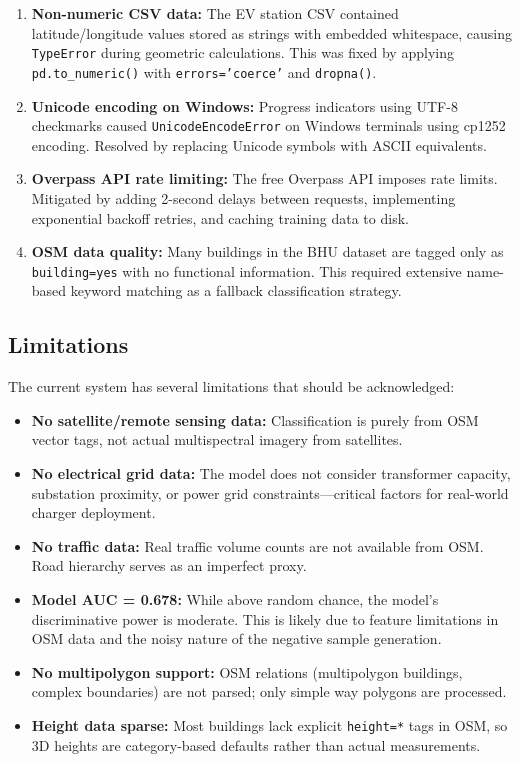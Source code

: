 \documentclass[conference]{IEEEtran}
\begin{document}
\begin{enumerate}
\item \textbf{Non-numeric CSV data:} The EV station CSV contained latitude/longitude values stored as strings with embedded whitespace, causing \texttt{TypeError} during geometric calculations. This was fixed by applying \texttt{pd.to\_numeric()} with \texttt{errors='coerce'} and \texttt{dropna()}.

\item \textbf{Unicode encoding on Windows:} Progress indicators using UTF-8 checkmarks caused \texttt{UnicodeEncodeError} on Windows terminals using cp1252 encoding. Resolved by replacing Unicode symbols with ASCII equivalents.

\item \textbf{Overpass API rate limiting:} The free Overpass API imposes rate limits. Mitigated by adding 2-second delays between requests, implementing exponential backoff retries, and caching training data to disk.

\item \textbf{OSM data quality:} Many buildings in the BHU dataset are tagged only as \texttt{building=yes} with no functional information. This required extensive name-based keyword matching as a fallback classification strategy.
\end{enumerate}

\subsection{Limitations}

The current system has several limitations that should be acknowledged:

\begin{itemize}
\item \textbf{No satellite/remote sensing data:} Classification is purely from OSM vector tags, not actual multispectral imagery from satellites.

\item \textbf{No electrical grid data:} The model does not consider transformer capacity, substation proximity, or power grid constraints---critical factors for real-world charger deployment.

\item \textbf{No traffic data:} Real traffic volume counts are not available from OSM. Road hierarchy serves as an imperfect proxy.

\item \textbf{Model AUC = 0.678:} While above random chance, the model's discriminative power is moderate. This is likely due to feature limitations in OSM data and the noisy nature of the negative sample generation.

\item \textbf{No multipolygon support:} OSM relations (multipolygon buildings, complex boundaries) are not parsed; only simple way polygons are processed.

\item \textbf{Height data sparse:} Most buildings lack explicit \texttt{height=*} tags in OSM, so 3D heights are category-based defaults rather than actual measurements.
\end{itemize}
\end{document}
